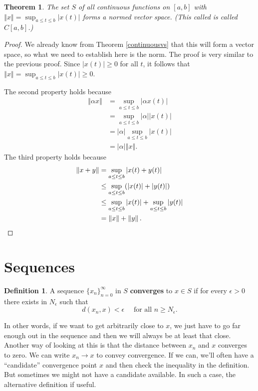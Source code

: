\documentclass[12pt]{article}
\newcommand{\norm}[1]{\left\Vert{#1}\right\Vert}
\newcommand{\abs}[1]{\left\vert{#1}\right\vert}
\newtheorem{theorem}{Theorem}
\theoremstyle{definition}
\newtheorem{definition}{Definition}
\begin{document}
\begin{theorem}
	The set $S$ of all continuous functions on $[a,b]$ with $\norm{x}=\sup_{a \leq t \leq b} \abs{x(t)}$ forms a normed vector space. (This called is called $C[a,b]$.)
\end{theorem}
\begin{proof}	
	We already know from Theorem \ref{continuousvs} that this will form a vector space, so what we need to establish here is the norm. The proof is very similar to the previous proof. Since $\abs{x(t)} \geq 0$ for all $t$, it follows that $\norm{x} = \sup_{a \leq t \leq b} \abs{x(t)} \geq 0$.
	
The second property holds because
	\begin{align*}
			\norm{\alpha x} &=  \sup_{a \leq t \leq b}  \abs{\alpha x(t)} \\
					&= \sup_{a \leq t \leq b} \abs{\alpha} \abs{x(t)}\\
					&= \abs{\alpha} \sup_{a \leq t \leq b} \abs{x(t)} \\
					&= \abs{\alpha} \norm{x}.
		\end{align*}
The third property holds because
		\begin{align*}
			\norm{x + y} &= \sup_{a \leq t \leq b} \abs{x(t) + y(t)}\\
				&\leq \sup_{a \leq t \leq b} (\abs{x(t)} + \abs{y(t)})\\
				&\leq \sup_{a \leq t \leq b} \abs{x(t)} + \sup_{a \leq t \leq b} \abs{y(t)}\\
				& = \norm{x} + \norm{y}. \qedhere
		\end{align*}
\end{proof} 




\section{Sequences} 

\begin{definition}
	A sequence $\{x_n\}_{n=0}^{\infty}$ in $S$ \textbf{converges} to $x \in S$ if for every $\epsilon > 0$ there exists in $N_{\epsilon}$ such that 
	\[d(x_n, x) < \epsilon \quad \text{ for all } n \geq N_{\epsilon}.	\]
\end{definition}

In other words, if we want to get arbitrarily close to $x$, we just have to go far enough out in the sequence and then we will always be at least that close. Another way of looking at this is that the distance between $x_n$ and $x$ converges to zero. We can write $x_n \rightarrow x$ to convey convergence. If we can, we'll often have a ``candidate'' convergence point $x$ and then check the inequality in the definition. But sometimes we might not have a candidate available. In such a case, the alternative definition if useful.
\end{document}
